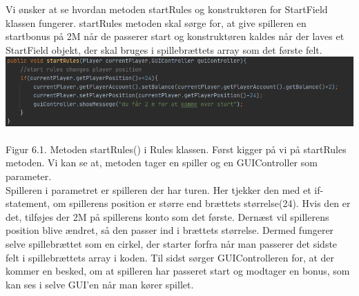 \begin{flushleft} %
\doublespacing


Vi ønsker at se hvordan metoden startRules og konstruktøren for StartField klassen fungerer. startRules metoden skal sørge for, at give spilleren en startbonus på 2M når de passerer start og konstruktøren kaldes når der laves et StartField objekt, der skal bruges i spillebrættets array som det første felt.
\includegraphics[width=1\textwidth]{Report/figures/startRules.PNG}~\\[0cm] 
Figur 6.1. Metoden startRules() i Rules klassen.
\addlinespace
Først kigger på vi på startRules metoden. Vi kan se at, metoden tager en spiller og en GUIController som parameter. \\
Spilleren i parametret er spilleren der har turen. Her tjekker den med et if-statement, om spillerens position er større end brættets størrelse(24). 
Hvis den er det, tilføjes der 2M på spillerens konto som det første.
Dernæst vil spillerens position blive ændret, så den passer ind i brættets størrelse. Dermed fungerer selve spillebrættet som en cirkel, der starter forfra når man passerer det sidste felt i spillebrættets array i koden. Til sidst sørger GUIControlleren for, at der kommer en besked, om at spilleren har passeret start og modtager en bonus, som kan ses i selve GUI'en når man kører spillet.


\end{flushleft}
